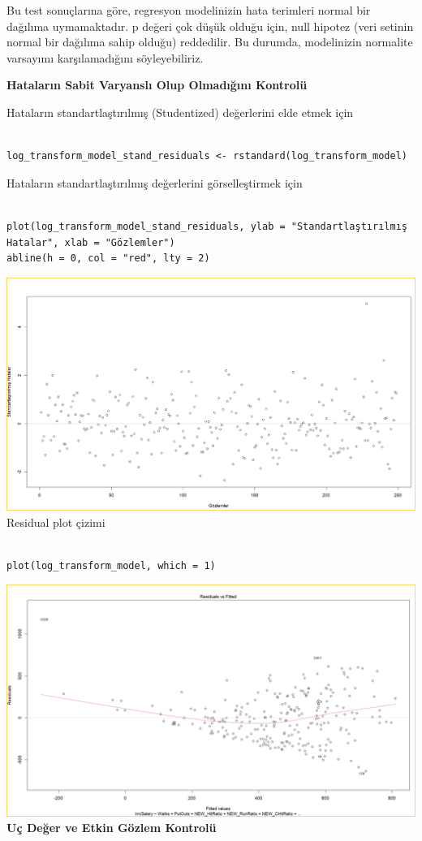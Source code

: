 \documentclass[
]{article}
\begin{document}
Bu test sonuçlarına göre, regresyon modelinizin hata terimleri normal
bir dağılıma uymamaktadır. p değeri çok düşük olduğu için, null hipotez
(veri setinin normal bir dağılıma sahip olduğu) reddedilir. Bu durumda,
modelinizin normalite varsayımı karşılamadığını söyleyebiliriz.

\textbf{Hataların Sabit Varyanslı Olup Olmadığını Kontrolü}

Hataların standartlaştırılmış (Studentized) değerlerini elde etmek için

\begin{verbatim}

log_transform_model_stand_residuals <- rstandard(log_transform_model)
\end{verbatim}

Hataların standartlaştırılmış değerlerini görselleştirmek için

\begin{verbatim}

plot(log_transform_model_stand_residuals, ylab = "Standartlaştırılmış Hatalar", xlab = "Gözlemler")
abline(h = 0, col = "red", lty = 2)
\end{verbatim}

\includegraphics{Picture10.png}Residual plot çizimi

\begin{verbatim}

plot(log_transform_model, which = 1)
\end{verbatim}

\includegraphics{Picture11.png}\textbf{Uç Değer ve Etkin Gözlem
Kontrolü}
\end{document}
